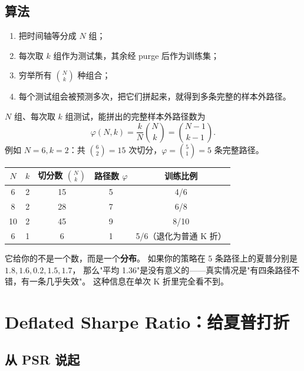 \subsection{算法}

\begin{enumerate}
  \item 把时间轴等分成 $N$ 组；
  \item 每次取 $k$ 组作为测试集，其余经 purge 后作为训练集；
  \item 穷举所有 $\binom{N}{k}$ 种组合；
  \item 每个测试组会被预测多次，把它们拼起来，就得到多条完整的样本外路径。
\end{enumerate}

\begin{proposition}[路径数]
$N$ 组、每次取 $k$ 组测试，能拼出的完整样本外路径数为
\begin{equation}
  \varphi(N,k) = \frac{k}{N}\binom{N}{k} = \binom{N-1}{k-1}.
\end{equation}
例如 $N=6,k=2$：共 $\binom{6}{2}=15$ 次切分，$\varphi=\binom{5}{1}=5$ 条完整路径。
\end{proposition}

\begin{center}
\begin{tabular}{@{}ccccc@{}}
\toprule
$N$ & $k$ & 切分数 $\binom{N}{k}$ & 路径数 $\varphi$ & 训练比例 \\
\midrule
6 & 2 & 15 & 5 & 4/6 \\
8 & 2 & 28 & 7 & 6/8 \\
10 & 2 & 45 & 9 & 8/10 \\
6 & 1 & 6 & 1 & 5/6（退化为普通 K 折）\\
\bottomrule
\end{tabular}
\end{center}

\begin{keybox}
它给你的不是一个数，而是一个\textbf{分布}。
如果你的策略在 5 条路径上的夏普分别是 $1.8, 1.6, 0.2, 1.5, 1.7$，
那么"平均 1.36"是没有意义的——真实情况是"有四条路径不错，有一条几乎失效"。
这种信息在单次 K 折里完全看不到。
\end{keybox}

\section{Deflated Sharpe Ratio：给夏普打折}

\subsection{从 PSR 说起}

